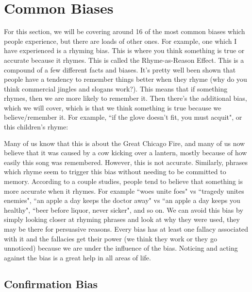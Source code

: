 \chapter{Common Biases}
\label{s:biases}
For this section, we will be covering around 16 of the most common biases which people experience, but there are loads of other ones. For example, one which I have experienced is a rhyming bias. This is where you think something is true or accurate because it rhymes. This is called the Rhyme-as-Reason Effect. This is a compound of a few different facts and biases. It's pretty well been shown that people have a tendency to remember things better when they rhyme (why do you think commercial jingles and slogans work?). This means that if something rhymes, then we are more likely to remember it. Then there's the additional bias, which we will cover, which is that we think something is true because we believe/remember it. For example, ``if the glove doesn't fit, you must acquit", or this children's rhyme:

Many of us know that this is about the Great Chicago Fire, and many of us now believe that it was caused by a cow kicking over a lantern, mostly because of how easily this song was remembered. However, this is not accurate. Similarly, phrases which rhyme seem to trigger this bias without needing to be committed to memory. According to a couple studies, people tend to believe that something is more accurate when it rhymes. For example ``woes unite foes" vs ``tragedy unites enemies", ``an apple a day keeps the doctor away" vs ``an apple a day keeps you healthy", ``beer before liquor, never sicker", and so on. We can avoid this bias by simply looking closer at rhyming phrases and look at why they were used, they may be there for persuasive reasons. Every bias has at least one fallacy associated with it and the fallacies get their power (we think they work or they go unnoticed) because we are under the influence of the bias. Noticing and acting against the bias is a great help in all areas of life. 

\section{Confirmation Bias}

